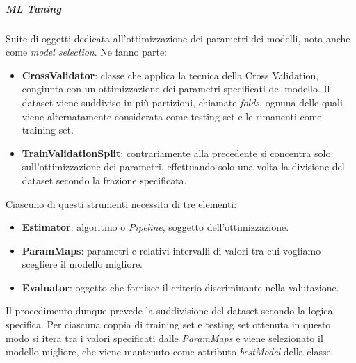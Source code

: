 \subparagraph{ML Tuning} 
Suite di oggetti dedicata all'ottimizzazione dei parametri dei modelli, nota anche come \textit{model selection}. Ne fanno parte:
\begin{itemize}
	\item \textbf{CrossValidator}: classe che applica la tecnica della Cross Validation, congiunta con un ottimizzazione dei parametri specificati del modello. Il dataset viene suddiviso in più partizioni, chiamate \textit{folds}, ognuna delle quali viene alternatamente considerata come testing set e le rimanenti come training set.
	\item \textbf{TrainValidationSplit}: contrariamente alla precedente si concentra solo sull'ottimizzazione dei parametri, effettuando solo una volta la divisione del dataset secondo la frazione specificata.
\end{itemize}
Ciascuno di questi strumenti necessita di tre elementi: 
\begin{itemize}
	\item \textbf{Estimator}: algoritmo o \textit{Pipeline}, soggetto dell'ottimizzazione.
	\item \textbf{ParamMaps}: parametri e relativi intervalli di valori tra cui vogliamo scegliere il modello migliore.
	\item \textbf{Evaluator}: oggetto che fornisce il criterio discriminante nella valutazione. 
\end{itemize}
Il procedimento dunque prevede la suddivisione del dataset secondo la logica specifica. Per ciascuna coppia di training set e testing set ottenuta in questo modo si itera tra i valori specificati dalle \textit{ParamMaps} e viene selezionato il modello migliore, che viene mantenuto come attributo \textit{bestModel} della classe.

